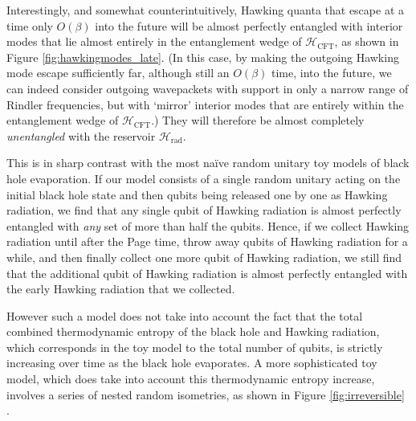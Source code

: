 \documentclass[11pt,a4paper]{article}
\begin{document}
Interestingly, and somewhat counterintuitively, Hawking quanta that escape at a time only $O(\beta)$ into the future will be almost perfectly entangled with interior modes that lie almost entirely in the entanglement wedge of $\mathcal{H}_\text{CFT}$, as shown in Figure \ref{fig:hawkingmodes_late}. (In this case, by making the outgoing Hawking mode escape sufficiently far, although still an $O(\beta)$ time, into the future, we can indeed consider outgoing wavepackets with support in only a narrow range of Rindler frequencies, but with `mirror' interior modes that are entirely within the entanglement wedge of $\mathcal{H}_\text{CFT}$.) They will therefore be almost completely \emph{unentangled} with the reservoir $\mathcal{H}_\text{rad}$. 

This is in sharp contrast with the most na\"{i}ve random unitary toy models of black hole evaporation. If our model consists of a single random unitary acting on the initial black hole state and then qubits being released one by one as Hawking radiation, we find that any single qubit of Hawking radiation is almost perfectly entangled with \emph{any} set of more than half the qubits. Hence, if we collect Hawking radiation until after the Page time, throw away qubits of Hawking radiation for a while, and then finally collect one more qubit of Hawking radiation, we still find that the additional qubit of Hawking radiation is almost perfectly entangled with the early Hawking radiation that we collected.

However such a model does not take into account the fact that the total combined thermodynamic entropy of the black hole and Hawking radiation, which corresponds in the toy model to the total number of qubits, is strictly increasing over time as the black hole evaporates. A more sophisticated toy model, which does take into account this thermodynamic entropy increase, involves a series of nested random isometries, as shown in Figure \ref{fig:irreversible} \cite{hayden2018learning}. 
\end{document}
